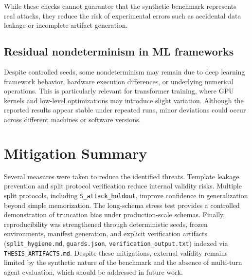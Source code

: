 While these checks cannot guarantee that the synthetic benchmark represents real attacks, they reduce the risk of experimental errors such as accidental data leakage or incomplete artifact generation.

\subsection{Residual nondeterminism in ML frameworks}
Despite controlled seeds, some nondeterminism may remain due to deep learning framework behavior, hardware execution differences, or underlying numerical operations. This is particularly relevant for transformer training, where GPU kernels and low-level optimizations may introduce slight variation. Although the reported results appear stable under repeated runs, minor deviations could occur across different machines or software versions.

\section{Mitigation Summary}
\label{subsec:validity_mitigation_summary}

Several measures were taken to reduce the identified threats. Template leakage prevention and split protocol verification reduce internal validity risks. Multiple split protocols, including \texttt{S\_attack\_holdout}, improve confidence in generalization beyond simple memorization. The long-schema stress test provides a controlled demonstration of truncation bias under production-scale schemas. Finally, reproducibility was strengthened through deterministic seeds, frozen environments, manifest generation, and explicit verification artifacts (\texttt{split\_hygiene.md}, \texttt{guards.json}, \texttt{verification\_output.txt}) indexed via \texttt{THESIS\_ARTIFACTS.md}. Despite these mitigations, external validity remains limited by the synthetic nature of the benchmark and the absence of multi-turn agent evaluation, which should be addressed in future work.
